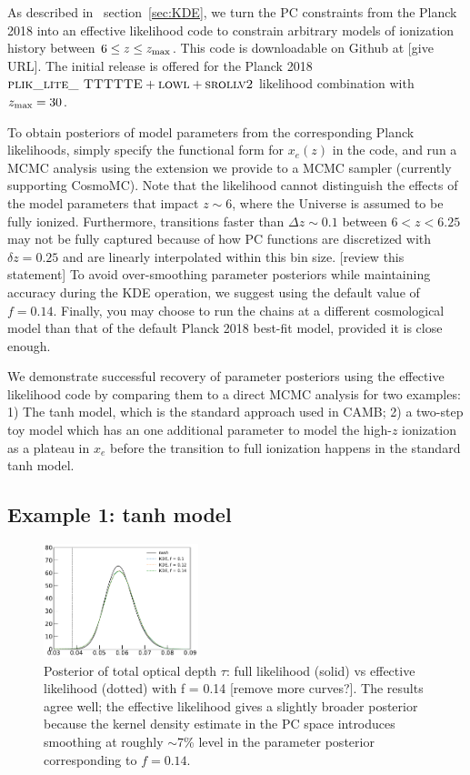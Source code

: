 \documentclass[prd,twocolumn,amsmath,amssymb,floatfix,superscriptaddress,nofootinbib]{revtex4-1}
\newcommand{\refsec}[1]{section~\ref{sec:#1}}
\newcommand{\zmax}{z_{\rm max}}
\begin{document}
As described in ~\refsec{KDE}, we turn the PC constraints from the Planck 2018 into an effective likelihood code to constrain arbitrary models of ionization history between $6 \leq z \leq \zmax$. This code is downloadable on Github at \url{} [give URL]. The initial release is offered for the Planck 2018 $\textsc{plik\_lite\_ TTTTTE} + \textsc{lowl} + \textsc{srollv2}$ likelihood combination with $\zmax = 30$. 

To obtain posteriors of model parameters from the corresponding Planck likelihoods, simply specify the functional form for $x_e(z)$ in the code, and run a MCMC analysis using the extension we provide to a MCMC sampler (currently supporting CosmoMC). Note that the likelihood cannot distinguish the effects of the model parameters that impact $z \sim 6$, where the Universe is assumed to be fully ionized. Furthermore, transitions faster than $\Delta z \sim 0.1$ between $6 < z < 6.25$ may not be fully captured because of how PC functions are discretized with $\delta z = 0.25$ and are linearly interpolated within this bin size. [review this statement] To avoid over-smoothing parameter posteriors while maintaining accuracy during the KDE operation, we suggest using the default value of $f = 0.14$. Finally, you may choose to run the chains at a different cosmological model than that of the default Planck 2018 best-fit model, provided it is close enough. 

We demonstrate successful recovery of parameter posteriors using the effective likelihood code by comparing them to a direct MCMC analysis for two examples: 1) The tanh model, which is the standard approach used in CAMB; 2) a two-step toy model which has an one additional parameter to model the high-$z$ ionization as a plateau in $x_e$ before the transition to full ionization happens in the standard tanh model.

\subsection{Example 1: tanh model}
\label{sec:example1}

\begin{figure}
\includegraphics[width=0.40\textwidth]{plots/pl18_pc_zmax30_pliklite_srollv2_1015_tau_posterior_fraccov_1p0_burnin_10000_yes_norm_gaussian0p1_0p12_0p14.pdf}
\caption{Posterior of total optical depth $\tau$: full likelihood (solid) vs effective likelihood (dotted) with f = 0.14 [remove more curves?]. The results agree well; the effective likelihood gives a slightly broader posterior because the kernel density estimate in the PC space introduces smoothing at roughly $\sim$7\% level in the parameter posterior corresponding to $f = 0.14$.
}
\label{fig:tanh_}
\end{figure}
\end{document}
